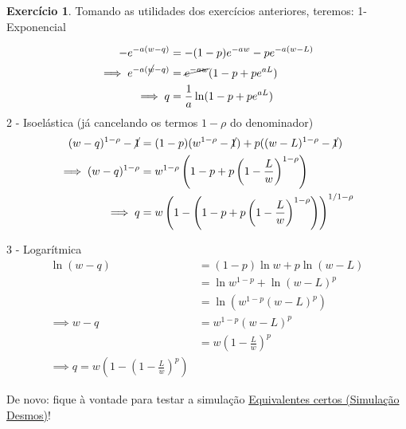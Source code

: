 \documentclass[12pt]{article}
\numberwithin{equation}{section}
\theoremstyle{plain}
\theoremstyle{definition}
\newtheorem{exercise}{Exercício}[section]
\theoremstyle{remark}
\begin{document}
\begin{exercise}
Tomando as utilidades dos exercícios anteriores, teremos: 1- Exponencial

\begin{align*}
-e^{-a(w-q)} &= -(1-p)e^{-aw} - pe^{-a(w-L)} \\
\implies e^{-a(\cancel{ w }-q)} &= \cancel{ e^{-aw} }(1-p + p e^{aL}) \\
\implies q &= \frac{1}{a}\ln(1-p+pe^{aL})
\end{align*} 2 - Isoelástica (já cancelando os termos \(1-\rho\) do
denominador) \begin{align*}
(w-q)^{1-\rho}-\cancel{ 1 } &= (1-p)(w^{1-\rho}-\cancel{ 1 }) + p ((w-L)^{1-\rho}-\cancel{ 1 }) \\
\implies (w-q)^{1-\rho} &= w^{1-\rho}\left( 1-p + p \left( 1-\frac{L}{w} \right)^{1-\rho} \right) \\
\implies q &= w \left(1- \left( 1-p + p \left( 1-\frac{L}{w} \right)^{1-\rho} \right)\right)^{1/1-\rho}
\end{align*}

3 - Logarítmica \begin{align*}
\ln(w-q) &= (1-p)\ln w + p\ln(w-L) \\
&=\ln w^{1-p}+ \ln(w-L)^{p} \\
&= \ln(w^{1-p}(w-L)^{p})\\
\implies w-q &= w ^{1-p} (w-L)^{p} \\
&= w \left( 1-\frac{L}{w} \right)^{p}\\
\implies q = w\left( 1-\left( 1-\frac{L}{w} \right)^{p} \right)
\end{align*}

De novo: fique à vontade para testar a simulação
\href{https://www.desmos.com/calculator/quce5bk5v5}{Equivalentes certos
(Simulação Desmos)}!
\end{exercise}

\printbibliography
\end{document}
